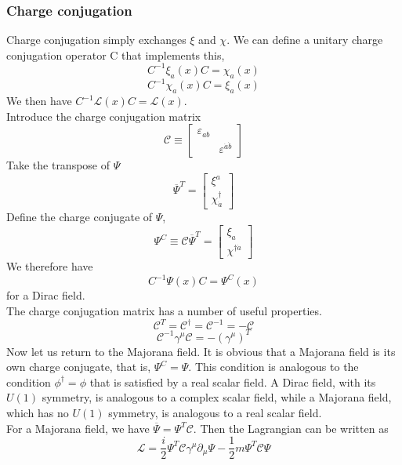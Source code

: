 \subsubsection{Charge conjugation}
\noindent
Charge conjugation simply exchanges $\xi$ and $\chi$. We can define a unitary charge conjugation operator C that implements this,
\[C^{-1}\xi_a(x)C = \chi_a(x)\]
\[C^{-1}\chi_a(x)C = \xi_a(x)\]
We then have $C^{-1}\mathcal{L}(x)C = \mathcal{L}(x)$.\\
Introduce the charge conjugation matrix
\[\mathcal{C} \equiv \left[ \begin{matrix} \varepsilon_{ab}& \\ & \varepsilon ^{\dot{a}\dot{b}}\end{matrix} \right]\]
Take the transpose of $\Psi$
\[\overline{\Psi}^T = \left[ \begin{matrix} \xi^a\\ \chi_{\dot{a}}^{\dagger}\end{matrix} \right] \]
Define the charge conjugate of $\Psi$,
\[\Psi^C \equiv \mathcal{C}\overline{\Psi}^T = \left[ \begin{matrix} \xi_a\\ \chi^{\dagger \dot{a}}\end{matrix} \right] \]
We therefore have
\[C^{-1}\Psi(x)C = \Psi^C(x)\]
for a Dirac field.\\
The charge conjugation matrix has a number of useful properties.
\[\mathcal{C}^T = \mathcal{C}^{\dagger} = \mathcal{C}^{-1} = -\mathcal{C}\]
\[\mathcal{C}^{-1} \gamma^{\mu} \mathcal{C} = - (\gamma^{\mu})^T\]
Now let us return to the Majorana field. It is obvious that a Majorana field is its own charge conjugate, that is, $\Psi^C = \Psi$. This condition is analogous to the condition $\phi^{\dagger} = \phi$ that is satisfied by a real scalar field. A Dirac field, with its $U(1)$ symmetry, is analogous to a complex scalar field, while a Majorana field, which has no $U(1)$ symmetry, is analogous to a real scalar field.\\
For a Majorana field, we have $\overline{\Psi} = \Psi^T \mathcal{C}$. Then the Lagrangian can be written as
\[\mathcal{L} = \frac{i}{2} \Psi^T \mathcal{C} \gamma^{\mu} \partial_{\mu} \Psi - \frac{1}{2}m \Psi^T \mathcal{C} \Psi\]

